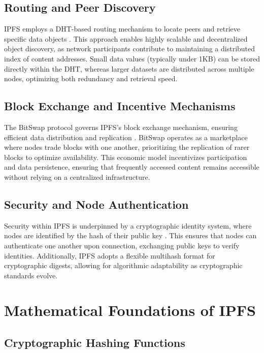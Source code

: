 \documentclass{article}
\begin{document}
\subsection{Routing and Peer Discovery}

IPFS employs a DHT-based routing mechanism to locate peers and retrieve specific data objects \cite{benet2014ipfs}. This approach enables highly scalable and decentralized object discovery, as network participants contribute to maintaining a distributed index of content addresses. Small data values (typically under 1KB) can be stored directly within the DHT, whereas larger datasets are distributed across multiple nodes, optimizing both redundancy and retrieval speed.

\subsection{Block Exchange and Incentive Mechanisms}

The BitSwap protocol governs IPFS’s block exchange mechanism, ensuring efficient data distribution and replication \cite{benet2014ipfs}. BitSwap operates as a marketplace where nodes trade blocks with one another, prioritizing the replication of rarer blocks to optimize availability. This economic model incentivizes participation and data persistence, ensuring that frequently accessed content remains accessible without relying on a centralized infrastructure.

\subsection{Security and Node Authentication}

Security within IPFS is underpinned by a cryptographic identity system, where nodes are identified by the hash of their public key \cite{benet2014ipfs}. This ensures that nodes can authenticate one another upon connection, exchanging public keys to verify identities. Additionally, IPFS adopts a flexible multihash format for cryptographic digests, allowing for algorithmic adaptability as cryptographic standards evolve.

\section{Mathematical Foundations of IPFS}

\subsection{Cryptographic Hashing Functions}
\end{document}
